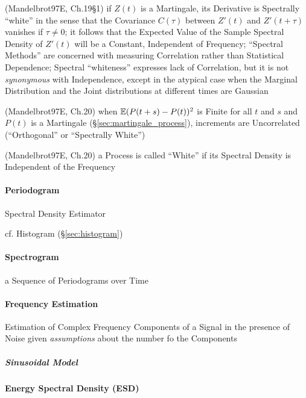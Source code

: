 (Mandelbrot97E, Ch.19\S 1) if $Z(t)$ is a Martingale, its Derivative is
Spectrally ``white'' in the sense that the Covariance $C(\tau)$ between $Z'(t)$
and $Z'(t + \tau)$ vanishes if $\tau \neq 0$; it follows that the Expected Value
of the Sample Spectral Density of $Z'(t)$ will be a Constant, Independent of
Frequency; ``Spectral Methods'' are concerned with measuring Correlation rather
than Statistical Dependence; Spectral ``whiteness'' expresses lack of
Correlation, but it is not \emph{synonymous} with Independence, except in the
atypical case when the Marginal Distribution and the Joint distributions at
different times are Gaussian

(Mandelbrot97E, Ch.20) when $\mathbb{E}(P(t+s) - P(t))^2$ is Finite for all $t$ and
$s$ and $P(t)$ is a Martingale (\S\ref{sec:martingale_process}), increments are
Uncorrelated (``Orthogonal'' or ``Spectrally White'')

(Mandelbrot97E, Ch.20) a Process is called ``White'' if its Spectral Density is
Independent of the Frequency



\paragraph{Periodogram}\label{sec:periodogram}\hfill

Spectral Density Estimator

cf. Histogram (\S\ref{sec:histogram})



\paragraph{Spectrogram}\label{sec:spectrogram}\hfill

a Sequence of Periodograms over Time



\paragraph{Frequency Estimation}\label{sec:frequency_estimation}\hfill

Estimation of Complex Frequency Components of a Signal in the presence of Noise
given \emph{assumptions} about the number fo the Components



\subparagraph{Sinusoidal Model}\label{sec:sinusoidal_model}\hfill



\paragraph{Energy Spectral Density (ESD)}\label{sec:esd}\hfill

